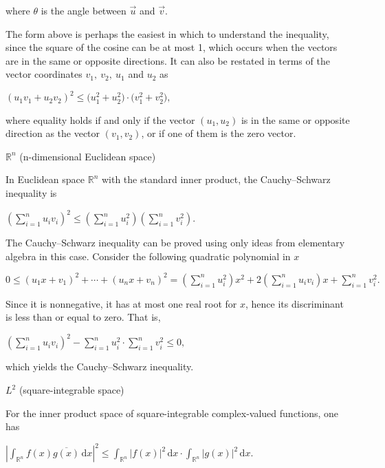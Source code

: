 \documentclass[UTF8]{ctexart}
\newcommand\dif{\mathrm{d}}
\newcommand\dis{\displaystyle}
\newcommand\ls{\leqslant}
\newcommand\sumin{\dis\sum\limits_{i=1}^{n}}
\begin{document}
\begin{spacing}{2}
where $\theta$  is the angle between $\stackrel{\rightarrow}{u}$ and $\stackrel{\rightarrow}{v}$.

The form above is perhaps the easiest in which to understand the inequality, since the square of the cosine can be at most 1, which occurs when the vectors are in the same or opposite directions. It can also be restated in terms of the vector coordinates ${\displaystyle v_{1},\ v_{2},\ u_{1}}$ and $u_{2}$ as

\centerline{\textcolor[rgb]{0,0,1}{${\displaystyle (u_{1}v_{1}+u_{2}v_{2})^{2}\ls \big(u_{1}^{2}+u_{2}^{2}\big)\cdot \big(v_{1}^{2}+v_{2}^{2}\big)},\ $}}

where equality holds if and only if the vector $(u_{1},u_{2})$ is in the same or opposite direction as the vector ${\displaystyle (v_{1},v_{2})}$, or if one of them is the zero vector.

\textcolor[rgb]{1,0,0}{$\mathbb{R}^n$ (n-dimensional Euclidean space)}

In Euclidean space ${\displaystyle \mathbb {R} ^{n}}$ with the standard inner product, the Cauchy–Schwarz inequality is

\centerline{\textcolor[rgb]{0,0,1}{${\displaystyle \left(\sum _{i=1}^{n}u_{i}v_{i}\right)^{2}\ls \left(\sum _{i=1}^{n}u_{i}^{2}\right)\left(\sum _{i=1}^{n}v_{i}^{2}\right)} .$}}

The Cauchy–Schwarz inequality can be proved using only ideas from elementary algebra in this case. Consider the following quadratic polynomial in $x$

\centerline{\textcolor[rgb]{0,0,1}{${\displaystyle 0\ls (u_{1}x+v_{1})^{2}+\cdots +(u_{n}x+v_{n})^{2}=\left(\sumin u_{i}^{2}\right)x^{2}+2\left(\sumin u_{i}v_{i}\right)x+\sumin v_{i}^{2}.} $}}

Since it is nonnegative, it has at most one real root for $x$, hence its discriminant is less than or equal to zero. That is,

\centerline{\textcolor[rgb]{0,0,1}{${\displaystyle \left(\sumin u_{i}v_{i}\right)^{2}-\sumin {u_{i}^{2}}\cdot \sumin {v_{i}^{2}}\ls 0,} $}}

which yields the Cauchy–Schwarz inequality.

\textcolor[rgb]{1,0,0}{$L^2$ (square-integrable space)}

For the inner product space of square-integrable complex-valued functions, one has

\centerline{\textcolor[rgb]{0,0,1}{${\displaystyle \left|\int _{\mathbb {R} ^{n}}f(x){\overline {g(x)}}\,\dif x\right|^{2}\ls \int _{\mathbb {R} ^{n}}|f(x)|^{2}\,\dif x\cdot \int _{\mathbb {R} ^{n}}|g(x)|^{2}\,\dif x.} $}}


\end{spacing}
\end{document}
